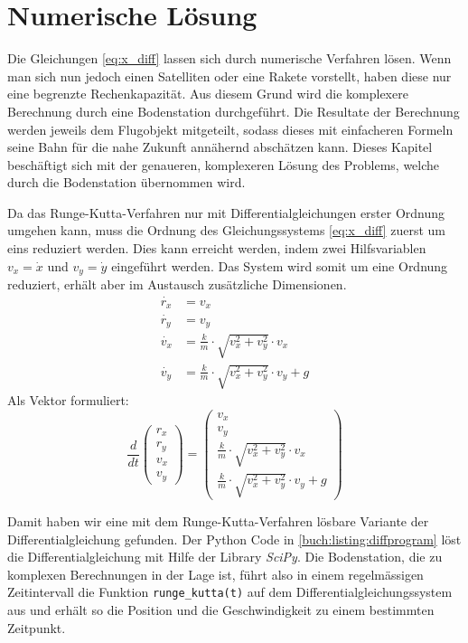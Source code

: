 \section{Numerische Lösung
\label{perturbation:section:nummerischeloesung}}
Die Gleichungen \eqref{eq:x_diff} lassen sich durch numerische Verfahren lösen.
Wenn man sich nun jedoch einen Satelliten oder eine Rakete vorstellt, haben diese nur eine begrenzte Rechenkapazität.
Aus diesem Grund wird die komplexere Berechnung durch eine Bodenstation durchgeführt.
Die Resultate der Berechnung werden jeweils dem Flugobjekt mitgeteilt, sodass dieses mit einfacheren Formeln seine Bahn für die nahe Zukunft annähernd abschätzen kann.
Dieses Kapitel beschäftigt sich mit der genaueren, komplexeren Lösung des Problems, welche durch die Bodenstation übernommen wird.

Da das Runge-Kutta-Verfahren nur mit Differentialgleichungen erster Ordnung umgehen kann, muss die Ordnung des Gleichungssystems \eqref{eq:x_diff}  zuerst um eins reduziert werden.
Dies kann erreicht werden, indem zwei Hilfsvariablen $v_x = \dot{x}$ und $v_y = \dot{y}$ eingeführt werden.
Das System wird somit um eine Ordnung reduziert, erhält aber im Austausch zusätzliche Dimensionen.
\begin{equation*}
\begin{aligned}
	\dot{r_x} &= v_x  \\
	\dot{r_y} &= v_y \\
	\dot{v_x} &= \frac{k}{m} \cdot \sqrt{v_x^2 + v_y^2} \cdot v_x \\
	\dot{v_y} &= \frac{k}{m} \cdot \sqrt{v_x^2 + v_y^2} \cdot v_y + g
\end{aligned}
\end{equation*}
Als Vektor formuliert:
\[
\frac{d}{dt}\begin{pmatrix}r_x\\r_y\\v_x\\v_y\end{pmatrix} = \begin{pmatrix}v_x\\v_y\\\frac{k}{m} \cdot \sqrt{v_x^2 + v_y^2} \cdot v_x\\\frac{k}{m} \cdot \sqrt{v_x^2 + v_y^2} \cdot v_y + g\end{pmatrix}
\]

Damit haben wir eine mit dem  Runge-Kutta-Verfahren lösbare Variante der Differentialgleichung gefunden.
Der Python Code in \ref{buch:listing:diffprogram} löst die Differentialgleichung mit Hilfe der Library \textit{SciPy}.
Die Bodenstation, die zu komplexen Berechnungen in der Lage ist,
führt also in einem regelmässigen Zeitintervall die Funktion \lstinline[language=Python]{runge_kutta(t)}
auf dem Differentialgleichungssystem aus und erhält so die Position und die Geschwindigkeit zu einem bestimmten Zeitpunkt.




